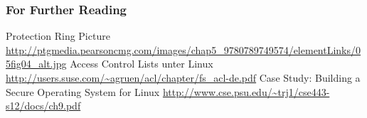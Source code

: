 \documentclass[ucs,9pt]{beamer}
\begin{document}
\begin{frame}[allowframebreaks]
  \frametitle<presentation>{For Further Reading}
    
  \begin{thebibliography}{10}

  \beamertemplatearticlebibitems

    Protection Ring Picture
    \newblock \url{http://ptgmedia.pearsoncmg.com/images/chap5_9780789749574/elementLinks/05fig04_alt.jpg}
    Access Control Lists unter Linux
    \newblock \url{http://users.suse.com/~agruen/acl/chapter/fs_acl-de.pdf}  
    Case Study: Building a Secure Operating System for Linux
    \newblock \url{http://www.cse.psu.edu/~trj1/cse443-s12/docs/ch9.pdf}  
  \end{thebibliography}
\end{frame}
\end{document}
